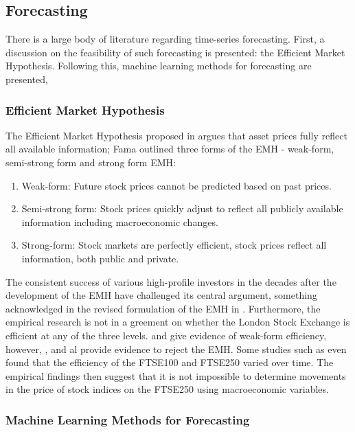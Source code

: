 \documentclass[11pt,a4paper]{article}
\newcommand{\citeboth}[1]{\citeauthor{#1} \citep{#1}}
\begin{document}
\subsection{Forecasting}

There is a large body of literature regarding time-series forecasting. First, 
a discussion on the feasibility of such forecasting is presented: the Efficient 
Market Hypothesis. Following this, machine learning methods for forecasting are 
presented, 

\subsubsection{Efficient Market Hypothesis}

The Efficient Market Hypothesis proposed in \citeboth{fama1970} argues that asset prices fully 
reflect all available information; Fama outlined three forms of the EMH - 
weak-form, semi-strong form and strong form EMH:
\begin{enumerate}
    \item Weak-form: Future stock prices cannot be predicted based on past prices.
    \item Semi-strong form: Stock prices quickly adjust to reflect all publicly available information including macroeconomic changes.  
    \item Strong-form: Stock markets are perfectly efficient, stock prices reflect all information, both public and private.
\end{enumerate}

The consistent success of various high-profile investors in the decades 
after the development of the EMH have challenged 
its central argument, something acknowledged in the revised formulation of the EMH 
in \citeboth{fama1991}. Furthermore, the empirical research is not in a
greement on whether the London Stock Exchange is efficient at any of the three levels. 
\citeboth{libberton2010} and \citeboth{rounaghi} give evidence of weak-form efficiency,
however, \citeboth{borges2010}, \citeboth{asghar2023} and \citeboth{bhavsar2015} al provide evidence to reject the EMH. 
Some studies such as \citeboth{rosini2020} even found that the 
efficiency of the FTSE100 and FTSE250 varied over time. The empirical findings then suggest 
that it is not impossible to determine movements in the 
price of stock indices on the FTSE250 using macroeconomic variables.

\subsubsection{Machine Learning Methods for Forecasting}
\end{document}
